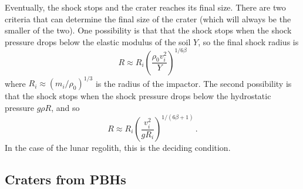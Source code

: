 \documentclass[usenatbib]{mnras}
\begin{document}
Eventually, the shock stops and the crater reaches its final size. There are two criteria that can determine the final size of the crater (which will always be the smaller of the two). One possibility is that that the shock stops when the shock pressure drops below the elastic modulus of the soil $Y$, so the final shock radius is
\begin{equation}
    R \approx R_i \left(\frac{\rho_0 v_i^2}{Y}\right)^{1/6\beta}
\end{equation}
where $R_i \approx \left(m_i/\rho_0\right)^{1/3}$ is the radius of the impactor. The second possibility is that the shock stops when the shock pressure drops below the hydrostatic pressure $g \rho R$, and so
\begin{equation}
    R \approx R_i \left(\frac{v_i^2}{g R_i}\right)^{1/\left(6\beta+1\right)} \, .
\end{equation}
In the case of the lunar regolith, this is the deciding condition.

\subsection{Craters from PBHs}
\end{document}
